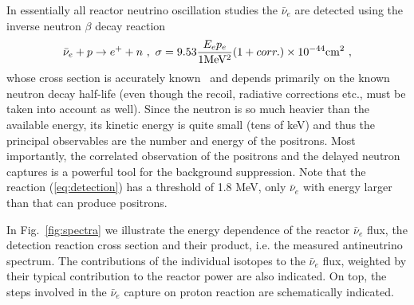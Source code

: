 \documentclass[aps,twocolumn,preprintnumbers,amsmath,superscriptaddress,amssymb,floats,nofootinbib]{revtex4-1}
\begin{document}
In essentially all reactor neutrino oscillation studies the $\bar{\nu}_e$ are detected using the inverse neutron $\beta$ decay reaction
\begin{equation}
\bar{\nu}_e + p \rightarrow e^+ + n~, \\ ~ \sigma = 9.53 \frac{E_e p_e}{ 1  {\rm MeV^2}} (1 + corr.) \times 10^{-44} {\rm cm^2} ~,
\label{eq:detection}
\end{equation}
whose cross section is accurately known~\cite{VB99, Strumia} and depends primarily on the known neutron decay half-life (even though the recoil, radiative
corrections etc., must be taken into account as well). Since the neutron is so much heavier than the available energy, its kinetic energy is quite
small (tens of keV) and thus the principal observables are the number and energy of the positrons. Most importantly, the correlated observation of the
positrons and the delayed neutron captures is a powerful tool for the background suppression. Note that the reaction (\ref{eq:detection}) has
a threshold of 1.8 MeV, only $\bar{\nu}_e$ with energy larger than that can produce positrons. 

In Fig.~\ref{fig:spectra} we illustrate the energy dependence of the reactor $\bar{\nu}_e$ flux, the detection reaction cross section and their product,
i.e. the measured antineutrino spectrum. The contributions of the individual isotopes to the $\bar{\nu}_e$ flux, weighted by their typical contribution
to the reactor power are also indicated. On top, the steps involved in the $\bar{\nu}_e$ capture on proton reaction are schematically indicated. 


\onecolumngrid
\vspace{12pt}
\fboxsep=12pt
\end{document}
